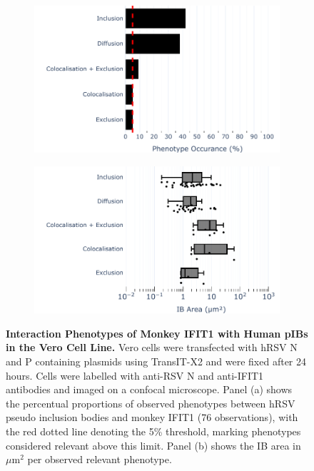 \begin{figure}
    \begin{subfigure}{0.495\textwidth}
        \caption{}
        \includegraphics[width=1\linewidth]{09. Chapter 4/Figs/01. pIB/02. IFIT1/04. bar_i1_vero_hnhp.pdf} 
    \end{subfigure}
    \begin{subfigure}{0.495\textwidth}
        \caption{}
        \includegraphics[width=1\linewidth]{09. Chapter 4/Figs/01. pIB/02. IFIT1/05. box_i1_vero_hnhp.pdf}
    \end{subfigure}
    \caption[Interaction Phenotypes of Monkey IFIT1 with Human pIBs in the Vero Cell Line.]{\textbf{Interaction Phenotypes of Monkey IFIT1 with Human pIBs in the Vero Cell Line.} Vero cells were transfected with hRSV N and P containing plasmids using TransIT-X2 and were fixed after 24 hours. Cells were labelled with anti-RSV N and anti-IFIT1 antibodies and imaged on a confocal microscope. Panel (a) shows the percentual proportions of observed phenotypes between hRSV pseudo inclusion bodies and monkey IFIT1 (76 observations), with the red dotted line denoting the 5\% threshold, marking phenotypes considered relevant above this limit. Panel (b) shows the IB area in \(\mu \mbox{m}^2\) per observed relevant phenotype.}
    \label{fig:Interaction Phenotypes of Monkey IFIT1 with Human pIBs in the VERO Cell Line}
\end{figure}


